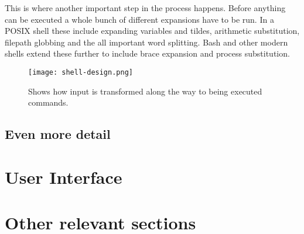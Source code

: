 This is where another important step in the process happens.
Before anything can be executed a whole bunch of different expansions have to be run. In a POSIX shell these include expanding variables and tildes, arithmetic substitution, filepath globbing and the all important word splitting.
Bash and other modern shells extend these further to include brace expansion and process substitution.

\begin{figure}[hp]
    \centering
    \texttt{[image: shell-design.png]}
    \caption[Shell execution pipeline]{Shows how input is transformed along the way to being executed commands.}
    \label{fig:shell-flowchart}
\end{figure}

\subsection{Even more detail}

\section{User Interface}

\section{Other relevant sections}